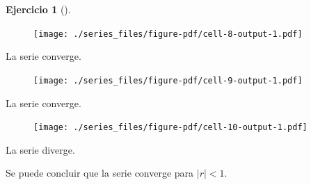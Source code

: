 \documentclass[
  a4paper,
]{scrreport}
\newenvironment{Shaded}{\begin{snugshade}}{\end{snugshade}}
\newcommand{\FloatTok}[1]{\textcolor[rgb]{0.68,0.00,0.00}{#1}}
\newcommand{\FunctionTok}[1]{\textcolor[rgb]{0.28,0.35,0.67}{#1}}
\newcommand{\NormalTok}[1]{\textcolor[rgb]{0.00,0.23,0.31}{#1}}
\newcommand{\OperatorTok}[1]{\textcolor[rgb]{0.37,0.37,0.37}{#1}}
\newcommand{\SpecialCharTok}[1]{\textcolor[rgb]{0.37,0.37,0.37}{#1}}
\newcommand{\StringTok}[1]{\textcolor[rgb]{0.13,0.47,0.30}{#1}}
\theoremstyle{definition}
\newtheorem{exercise}{Ejercicio}[chapter]
\theoremstyle{remark}
\begin{document}
\begin{exercise}[]
\begin{tcolorbox}
\begin{figure}[H]

{\centering \texttt{[image: ./series\_files/figure-pdf/cell-8-output-1.pdf]}

}

\end{figure}

La serie converge.

\begin{Shaded}
\end{Shaded}

\begin{figure}[H]

{\centering \texttt{[image: ./series\_files/figure-pdf/cell-9-output-1.pdf]}

}

\end{figure}

La serie converge.

\begin{Shaded}
\end{Shaded}

\begin{figure}[H]

{\centering \texttt{[image: ./series\_files/figure-pdf/cell-10-output-1.pdf]}

}

\end{figure}

La serie diverge.

Se puede concluir que la serie converge para \(|r|<1\).

\end{tcolorbox}

\end{exercise}
\end{document}

